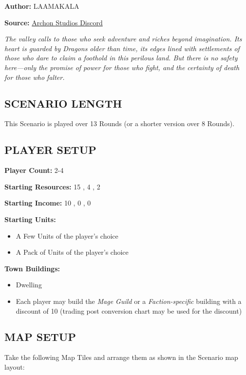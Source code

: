 
\begin{multicols*}{2}

\textbf{Author:} LAAMAKALA

\textbf{Source:} \href{https://discord.com/channels/740870068178649108/1239631918643941509}{Archon Studios Discord}

\textit{The valley calls to those who seek adventure and riches beyond imagination. Its heart is guarded by Dragons older than time, its edges lined with settlements of those who dare to claim a foothold in this perilous land. But there is no safety here—only the promise of power for those who fight, and the certainty of death for those who falter.}

\subsection*{\MakeUppercase{Scenario Length}}
This Scenario is played over 13 Rounds (or a shorter version over 8 Rounds).

\subsection*{\MakeUppercase{Player Setup}}
\textbf{Player Count:} 2-4

\textbf{Starting Resources:} 15 , 4 , 2 

\textbf{Starting Income:} 10 , 0 , 0 

\textbf{Starting Units:}
\begin{itemize}
  \item A Few  Units of the player's choice
  \item A Pack of  Units of the player's choice
\end{itemize}

\textbf{Town Buildings:} 
\begin{itemize}
  \item {} Dwelling
  \item Each player may build the \textit{Mage Guild} or a \textit{Faction-specific} building with a discount of 10  (trading post conversion chart may be used for the discount)
\end{itemize}

\subsection*{\MakeUppercase{Map Setup}}
Take the following Map Tiles and arrange them as shown in the Scenario map layout:


\end{multicols*}
